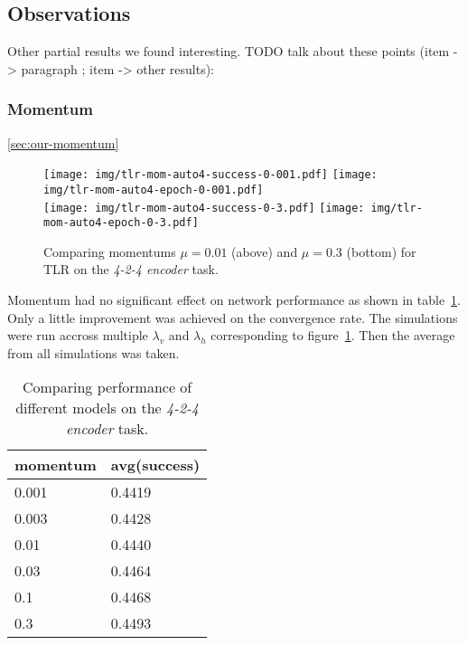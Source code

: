 
\subsection{Observations}
\label{sec:results-other} 

Other partial results we found interesting. 
TODO talk about these points (item -> paragraph ; item -> other results): 

 

\subsubsection{Momentum}
\label{sec:results-momentum} 

\ref{sec:our-momentum} 

\begin{figure}[H]
  \centering
  \texttt{[image: img/tlr-mom-auto4-success-0-001.pdf]}  
  \texttt{[image: img/tlr-mom-auto4-epoch-0-001.pdf]}  \\
  \texttt{[image: img/tlr-mom-auto4-success-0-3.pdf]}  
  \texttt{[image: img/tlr-mom-auto4-epoch-0-3.pdf]}  
  \caption{Comparing momentums $\mu=0.01$ (above) and $\mu=0.3$ (bottom) for TLR on the \emph{4-2-4 encoder} task.}
  \label{fig:results-tlr-auto4-momentum}
\end{figure}

Momentum had no significant effect on network performance as shown in table~\ref{tab:results-mom-auto4}. Only a little improvement was achieved on the convergence rate. The simulations were run accross multiple $\lambda_v$ and $\lambda_h$ corresponding to figure~\ref{fig:results-tlr-auto4-momentum}. Then the average from all simulations was taken. 
\begin{table}[H] 
  \centering
  {\small
    \begin{tabular}{|l|l|}
    \hline
momentum & avg(success) \\
    \hline
0.001  & 0.4419 \\
    \hline
0.003  & 0.4428 \\
    \hline
0.01   & 0.4440 \\
    \hline
0.03   & 0.4464 \\
    \hline
0.1    & 0.4468 \\
    \hline
0.3    & 0.4493 \\
    \hline
    \end{tabular}
  }
  \caption{Comparing performance of different models on the \emph{4-2-4 encoder} task.} 
  \label{tab:results-mom-auto4}
\end{table}


 
